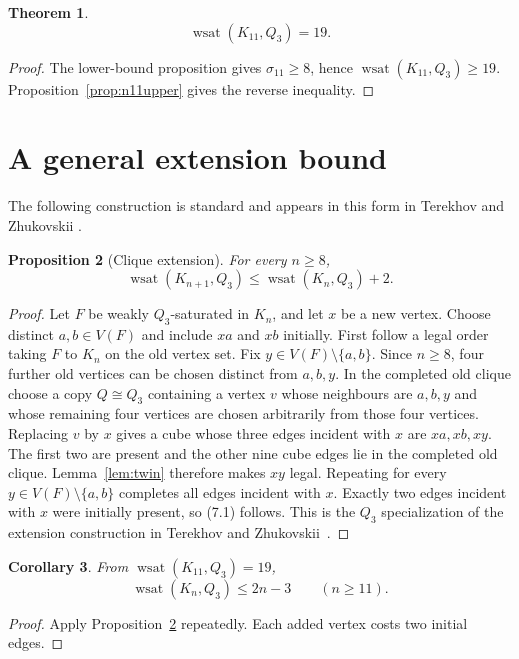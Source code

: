 \documentclass[11pt]{article}
\numberwithin{equation}{section}
\newtheorem{theorem}{Theorem}[section]
\newtheorem{proposition}[theorem]{Proposition}
\newtheorem{corollary}[theorem]{Corollary}
\newcommand{\wsat}{\operatorname{wsat}}
\begin{document}
\begin{theorem}\label{thm:n11}
\[
\boxed{\wsat(K_{11},Q_3)=19.}
\]
\end{theorem}

\begin{proof}
The lower-bound proposition gives $\sigma_{11}\ge8$, hence $\wsat(K_{11},Q_3)\ge19$. Proposition~\ref{prop:n11upper} gives the reverse inequality.
\end{proof}

\section{A general extension bound}\label{sec:extension}
The following construction is standard and appears in this form in Terekhov and Zhukovskii \cite{TZ2025}.

\begin{proposition}[Clique extension]\label{prop:extension}
For every $n\ge8$,
\[
\wsat(K_{n+1},Q_3)\le \wsat(K_n,Q_3)+2.
\tag{7.1}
\]
\end{proposition}

\begin{proof}
Let $F$ be weakly $Q_3$-saturated in $K_n$, and let $x$ be a new vertex.
Choose distinct $a,b\in V(F)$ and include $xa$ and $xb$ initially. First follow
a legal order taking $F$ to $K_n$ on the old vertex set. Fix
$y\in V(F)\setminus\{a,b\}$. Since $n\ge8$, four further old vertices can be
chosen distinct from $a,b,y$. In the completed old clique choose a copy
$Q\cong Q_3$ containing a vertex $v$ whose neighbours are $a,b,y$ and whose
remaining four vertices are chosen arbitrarily from those four vertices.
Replacing $v$ by $x$ gives a cube whose three edges incident with $x$ are
$xa,xb,xy$. The first two are present and the other nine cube edges lie in the
completed old clique. Lemma~\ref{lem:twin} therefore makes $xy$ legal. Repeating
for every $y\in V(F)\setminus\{a,b\}$ completes all edges incident with $x$.
Exactly two edges incident with $x$ were initially present, so (7.1) follows.
This is the $Q_3$ specialization of the extension construction in
Terekhov and Zhukovskii~\cite{TZ2025}.
\end{proof}

\begin{corollary}\label{cor:family}
From $\wsat(K_{11},Q_3)=19$,
\[
\boxed{\wsat(K_n,Q_3)\le2n-3\qquad(n\ge11).}
\tag{7.2}
\]
\end{corollary}

\begin{proof}
Apply Proposition~\ref{prop:extension} repeatedly. Each added vertex costs two initial edges.
\end{proof}
\end{document}
